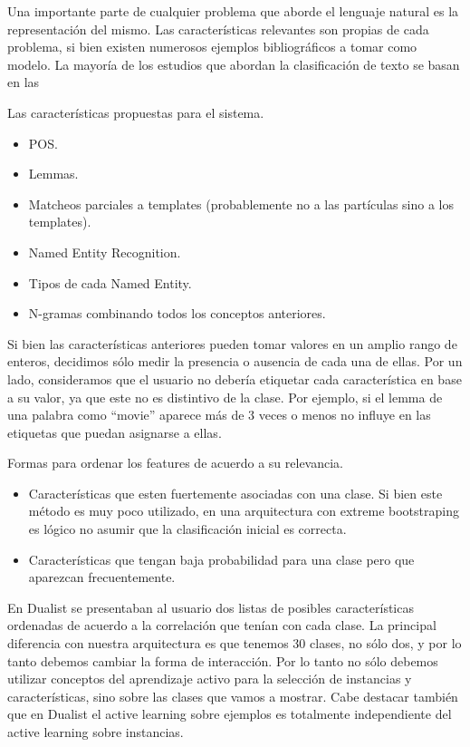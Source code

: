 
Una importante parte de cualquier problema que aborde el lenguaje natural es la representación del mismo. Las características relevantes son propias de cada problema, si bien existen numerosos ejemplos bibliográficos a tomar como modelo.
La mayoría de los estudios que abordan la clasificación de texto se basan en las

Las características propuestas para el sistema.
\begin{itemize}
    \item POS.
    \item Lemmas.
    \item Matcheos parciales a templates (probablemente no a las partículas sino a los templates).
    \item Named Entity Recognition.
    \item Tipos de cada Named Entity.
    \item N-gramas combinando todos los conceptos anteriores.

\end{itemize}

Si bien las características anteriores pueden tomar valores en un amplio rango de enteros, decidimos sólo medir la presencia o ausencia de cada una de ellas. Por un lado, consideramos que el usuario no debería etiquetar cada característica en base a su valor, ya que este no es distintivo de la clase. Por ejemplo, si el lemma de una palabra como ``movie'' aparece más de 3 veces o menos no influye en las etiquetas que puedan asignarse a ellas.


Formas para ordenar los features de acuerdo a su relevancia.
\begin{itemize}
	\item Características que esten fuertemente asociadas con una clase. Si bien este método es muy poco utilizado, en una arquitectura con extreme bootstraping es lógico no asumir que la clasificación inicial es correcta.
	\item Características que tengan baja probabilidad para una clase pero que
	aparezcan frecuentemente.
\end{itemize}

En Dualist se presentaban al usuario dos listas de posibles características ordenadas de acuerdo a la correlación que tenían con cada clase. La principal diferencia con nuestra arquitectura es que tenemos 30 clases, no sólo dos, y por lo tanto debemos cambiar la forma de interacción. Por lo tanto no sólo debemos utilizar conceptos del aprendizaje activo para la selección de instancias y características, sino sobre las clases que vamos a mostrar. Cabe destacar también que en Dualist el active learning sobre ejemplos es totalmente independiente
del active learning sobre instancias.

